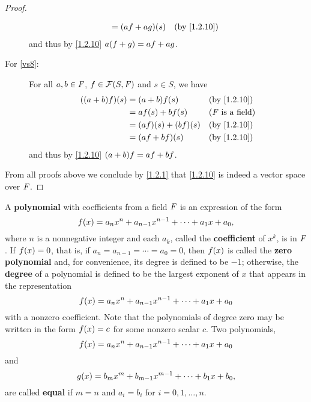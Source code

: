 \begin{proof}
\begin{description}
\begin{align*}
				                     & = \p{af + ag}\p{s}          &  & \text{(by \cref{1.2.10})}
			\end{align*}
			and thus by \cref{1.2.10} \(a \p{f + g} = af + ag\).
		\item[For \ref{vs8}:]
			For all \(a, b \in \mathit{F}\), \(f \in \FS\) and \(s \in S\), we have
			\begin{align*}
				\p{\p{a + b} f}\p{s} & = \p{a + b} f\p{s}          &  & \text{(by \cref{1.2.10})}  \\
				                     & = af\p{s} + bf\p{s}         &  & \text{(\(\F\) is a field)} \\
				                     & = \p{af}\p{s} + \p{bf}\p{s} &  & \text{(by \cref{1.2.10})}  \\
				                     & = \p{af + bf}\p{s}          &  & \text{(by \cref{1.2.10})}
			\end{align*}
			and thus by \cref{1.2.10} \(\p{a + b} f = af + bf\).
	\end{description}
	From all proofs above we conclude by \cref{1.2.1} that \cref{1.2.10} is indeed a vector space over \(\mathit{F}\).
\end{proof}

\begin{defn}\label{1.2.11}
	A \textbf{polynomial} with coefficients from a field \(\mathit{F}\) is an expression of the form
	\[
		f\p{x} = a_{n} x^{n} + a_{n - 1} x^{n - 1} + \cdots + a_{1} x + a_{0},
	\]
	where \(n\) is a nonnegative integer and each \(a_{k}\), called the \textbf{coefficient} of \(x^{k}\), is in \(\mathit{F}\).
	If \(f\p{x} = 0\), that is, if \(a_{n} = a_{n - 1} = \cdots = a_{0} = 0\), then \(f\p{x}\) is called the \textbf{zero polynomial} and, for convenience, its degree is defined to be \(-1\);
	otherwise, the \textbf{degree} of a polynomial is defined to be the largest exponent of \(x\) that appears in the representation
	\[
		f\p{x} = a_{n} x^{n} + a_{n - 1} x^{n - 1} + \cdots + a_{1} x + a_{0}
	\]
	with a nonzero coefficient.
	Note that the polynomials of degree zero may be written in the form \(f\p{x} = c\) for some nonzero scalar \(c\).
	Two polynomials,
	\[
		f\p{x} = a_{n} x^{n} + a_{n - 1} x^{n - 1} + \cdots + a_{1} x + a_{0}
	\]
	and
	\[
		g\p{x} = b_{m} x^{m} + b_{m - 1} x^{m - 1} + \cdots + b_{1} x + b_{0},
	\]
	are called \textbf{equal} if \(m = n\) and \(a_i = b_i\) for \(i = 0, 1, \dots, n\).
\end{defn}


